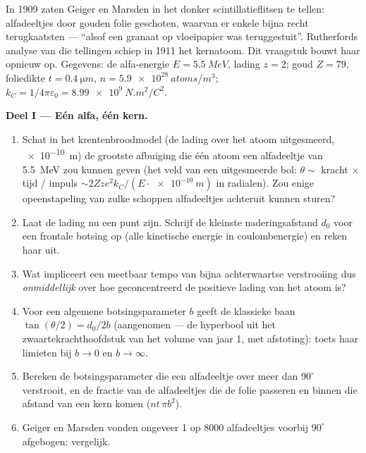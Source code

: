 \begin{problem}\label{pb:b3:scattering-theory:1}
In 1909 zaten Geiger en Marsden in het donker scintillatieflitsen te
tellen: alfadeeltjes door gouden folie geschoten, waarvan er enkele bijna
recht terugkaatsten --- ``alsof een granaat op vloeipapier was
teruggestuit''. Rutherfords analyse van die tellingen schiep in 1911 het
kernatoom. Dit vraagstuk bouwt haar opnieuw op. Gegevens: de alfa-energie
$E =
\qty{5.5}{MeV}$, lading $z = 2$; goud $Z = 79$, foliedikte $t
= \qty{0.4}{\micro m}$, $n = \qty{5.9e28}{atoms/m^3}$; $k_C =
1/4\pi\varepsilon_0 = \qty{8.99e9}{N.m^2/C^2}$.

\medskip\noindent\textbf{Deel I --- Eén alfa, één kern.}
\begin{enumerate}
  \item Schat in het krentenbroodmodel (de lading over het atoom
        uitgesmeerd, \qty{e-10}{m}) de grootste afbuiging die één atoom een
        alfadeeltje van \qty{5.5}{MeV} zou kunnen geven (het veld van een
        uitgesmeerde bol: $\theta \sim$ kracht $\times$ tijd / impuls
        $\sim 2Zze^2k_C/(E\cdot\qty{e-10}{m})$ in radialen). Zou enige
        opeenstapeling van zulke schoppen alfadeeltjes achteruit kunnen
        sturen?
  \item Laat de lading nu een punt zijn. Schrijf de kleinste
        naderingsafstand $d_0$ voor een frontale botsing op (alle
        kinetische energie in coulombenergie) en reken haar uit.
  \item Wat impliceert een meetbaar tempo van bijna achterwaartse
        verstrooiing dus \emph{onmiddellijk} over hoe geconcentreerd de
        positieve lading van het atoom is?
  \item Voor een algemene botsingsparameter $b$ geeft de klassieke baan
        $\tan(\theta/2) = d_0/2b$ (aangenomen --- de hyperbool uit het
        zwaartekrachthoofdstuk van het volume van jaar 1, met afstoting):
        toets haar limieten bij $b \to 0$ en $b \to
        \infty$.
  \item Bereken de botsingsparameter die een alfadeeltje over meer dan
        $90^\circ$ verstrooit, en de fractie van de alfadeeltjes die de
        folie passeren en binnen die afstand van een kern komen ($n t\,\pi
        b^2$).
  \item Geiger en Marsden vonden ongeveer 1 op 8000 alfadeeltjes voorbij
        $90^\circ$ afgebogen: vergelijk.
\end{enumerate}


\end{problem}
